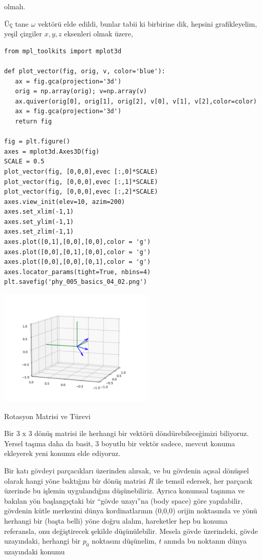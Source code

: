 \documentclass[12pt,fleqn]{article}\usepackage{../../common}
\begin{document}
olmalı.

Üç tane $\omega$ vektörü elde edildi, bunlar tabii ki birbirine dik, hepsini
grafikleyelim, yeşil çizgiler $x,y,z$ eksenleri olmak üzere,

\begin{verbatim}
from mpl_toolkits import mplot3d

def plot_vector(fig, orig, v, color='blue'):
   ax = fig.gca(projection='3d')
   orig = np.array(orig); v=np.array(v)
   ax.quiver(orig[0], orig[1], orig[2], v[0], v[1], v[2],color=color)
   ax = fig.gca(projection='3d')  
   return fig

fig = plt.figure()
axes = mplot3d.Axes3D(fig)
SCALE = 0.5
plot_vector(fig, [0,0,0],evec [:,0]*SCALE)
plot_vector(fig, [0,0,0],evec [:,1]*SCALE)
plot_vector(fig, [0,0,0],evec [:,2]*SCALE)
axes.view_init(elev=10, azim=200)
axes.set_xlim(-1,1)
axes.set_ylim(-1,1)
axes.set_zlim(-1,1)
axes.plot([0,1],[0,0],[0,0],color = 'g')
axes.plot([0,0],[0,1],[0,0],color = 'g')
axes.plot([0,0],[0,0],[0,1],color = 'g')
axes.locator_params(tight=True, nbins=4)
plt.savefig('phy_005_basics_04_02.png')
\end{verbatim}

\includegraphics[width=20em]{phy_005_basics_04_02.png}

Rotasyon Matrisi ve Türevi

Bir 3 x 3 dönüş matrisi ile herhangi bir vektörü döndürebileceğimizi biliyoruz.
Yersel taşıma daha da basit, 3 boyutlu bir vektör sadece, mevcut konuma
ekleyerek yeni konumu elde ediyoruz.

Bir katı gövdeyi parçacıkları üzerinden alırsak, ve bu gövdenin açısal dönüşsel
olarak hangi yöne baktığını bir dönüş matrisi $R$ ile temsil edersek, her
parçacık üzerinde bu işlemin uygulandığını düşünebiliriz. Ayrıca konumsal
taşınma ve bakılan yön başlangıçtaki bir ``gövde uzayı''na (body space) göre
yapılabilir, gövdenin kütle merkezini dünya kordinatlarının (0,0,0) orijin
noktasında ve yönü herhangi bir (başta belli) yöne doğru alalım, hareketler hep
bu konuma referansla, onu değiştirecek şekilde düşünülebilir.  Mesela gövde
üzerindeki, gövde uzayındaki, herhangi bir $p_0$ noktasını düşünelim, $t$ anında
bu noktanın dünya uzayındaki konumu
\end{document}
